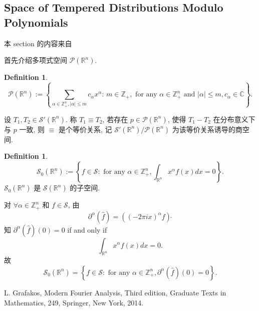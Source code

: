\documentclass[a4paper,11pt]{article}
\theoremstyle{definition}
\newtheorem{definition}[theorem]{Definition}
\begin{document}
\begin{CJK*}{UTF8}{gbsn}
\subsection{Space of Tempered Distributions Modulo Polynomials}

本 section 的内容来自 \cite[1.1.1]{g14}

首先介绍多项式空间 $ \mathcal{P}(\mathbb{R}^n) $.
\begin{definition}
    $$
        \mathcal{P}(\mathbb{R}^n) 
            := \left\{ \sum_{\alpha \in \mathbb{Z}_+^n, |\alpha| \leq m} c_\alpha x^{\alpha} :\,
                 m \in \mathbb{Z}_+, \text{ for any } \alpha \in \mathbb{Z}_+^n \text{ and } |\alpha| \leq m, c_\alpha \in \mathbb{C} \right\}.
    $$
\end{definition} 


设 $ T_1, T_2 \in \mathcal{S}'(\mathbb{R}^n) $. 称 $ T_1 \equiv T_2 $, 
若存在 $ p \in \mathcal{P}(\mathbb{R}^n) $, 使得 $ T_1 - T_2 $ 在分布意义下与 $ p $ 一致,
则 $ \equiv $ 是个等价关系, 记 $ \mathcal{S}'(\mathbb{R}^n)/ \mathcal{P}(\mathbb{R}^n) $ 为该等价关系诱导的商空间.


\begin{definition}
    $$
        \mathcal{S}_0(\mathbb{R}^n) 
            := \left\{ f \in \mathcal{S} :
                 \text{ for any } \alpha \in \mathbb{Z}_+^n, \int_{\mathbb{R}^n} x^\alpha f(x) dx = 0 \right\}.
    $$
    $ \mathcal{S}_0(\mathbb{R}^n) $ 是 $ \mathcal{S}(\mathbb{R}^n) $ 的子空间.
\end{definition} 


对 $ \forall \alpha \in \mathbb{Z}_+^n $ 和 $ f \in \mathcal{S} $, 由 
$$  
    \partial^\alpha (\hat{f}) = ((-2 \pi i x)^\alpha f) \, \hat{}
$$
知 $ \partial^\alpha (\hat{f}) (0) = 0 $ if and only if
$$
    \int_{\mathbb{R}^n} x^\alpha f(x) dx = 0.
$$
故
$$
    \mathcal{S}_0(\mathbb{R}^n) 
        = \left\{ f \in \mathcal{S} :
             \text{ for any } \alpha \in \mathbb{Z}_+^n, \partial^\alpha (\hat{f}) (0) = 0 \right\}.
$$

\begin{thebibliography}{99}
    
     L. Grafakos, Modern Fourier Analysis, Third edition, 
    Graduate Texts in Mathematics, 249, Springer, New York, 2014.
    
\end{thebibliography}

\end{CJK*}
\end{document}
